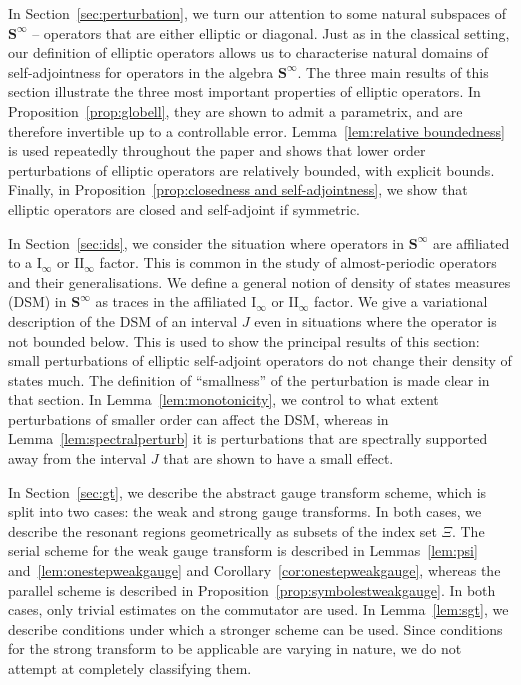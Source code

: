 \documentclass[10pt]{amsart}
\theoremstyle{definition}\newtheorem{defi}[theo]{Definition}\newtheorem{rema}[theo]{Remark}\newtheorem{exam}[theo]{Example}\newtheorem{nota}[theo]{Notation}
\newcommand{\rmI}{\mathrm{I}}
\newcommand{\rmII}{\mathrm{II}}
\newcommand{\BS}{\mathbf S}
\begin{document}
In Section~\ref{sec:perturbation}, we turn our attention to some natural subspaces of $\BS^\infty$ -- operators that are either elliptic or diagonal. Just as in the classical setting, our definition of elliptic operators allows us to characterise natural domains of self-adjointness for operators in the algebra $\BS^\infty$. The three main results of this section illustrate the three most important properties of elliptic operators. In Proposition~\ref{prop:globell}, they are shown to admit a parametrix, and are therefore invertible up to a controllable error. Lemma~\ref{lem:relative boundedness} is used repeatedly throughout the paper and shows that lower order perturbations of elliptic operators are relatively bounded, with explicit bounds. Finally, in Proposition~\ref{prop:closedness and self-adjointness}, we show that elliptic operators are closed and self-adjoint if symmetric.

In Section~\ref{sec:ids}, we consider the situation where operators in $\BS^\infty$ are affiliated to a $\rmI_\infty$ or $\rmII_\infty$ factor. This is common in the study of almost-periodic operators and their generalisations. We define a general notion of density of states measures (DSM) in $\BS^\infty$ as traces in the affiliated $\rmI_\infty$ or $\rmII_\infty$ factor. We give a variational description of the DSM of an interval $J$ even in situations where the operator is not bounded below. This is used to show the principal results of this section: small perturbations of elliptic self-adjoint operators do not change their density of states much. The definition of ``smallness'' of the perturbation is made clear in that section. In Lemma~\ref{lem:monotonicity}, we control to what extent perturbations of smaller order can affect the DSM, whereas in Lemma~\ref{lem:spectralperturb} it is perturbations that are spectrally supported away from the interval $J$ that are shown to have a small effect.

In Section~\ref{sec:gt}, we describe the abstract gauge transform scheme, which is split into two cases: the weak and strong gauge transforms. In both cases, we describe the resonant regions geometrically as subsets of the index set $\Xi$. The serial scheme for the weak gauge transform is described in Lemmas~\ref{lem:psi} and~\ref{lem:onestepweakgauge} and Corollary~\ref{cor:onestepweakgauge}, whereas the parallel scheme is described in Proposition~\ref{prop:symbolestweakgauge}. In both cases, only trivial estimates on the commutator are used. In Lemma~\ref{lem:sgt}, we describe conditions under which a stronger scheme can be used. Since conditions for the strong transform to be applicable are varying in nature, we do not attempt at completely classifying them.
\end{document}
